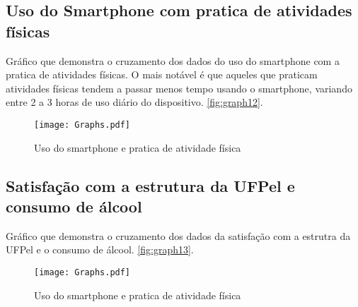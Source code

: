 \documentclass[11pt]{scrartcl} %
\begin{document}
\subsection{Uso do Smartphone com pratica de atividades físicas}

Gráfico que demonstra o cruzamento dos dados do uso do smartphone com a pratica de atividades físicas. O mais notável é que aqueles que praticam atividades físicas tendem a passar menos tempo usando o smartphone, variando entre 2 a 3 horas de uso diário do dispositivo. \ref{fig:graph12}.

\begin{figure}[h]
  \centering
  \texttt{[image: Graphs.pdf]}
  \label{fig:graph11}
  \caption{Uso do smartphone e pratica de atividade física}
\end{figure}

\subsection{Satisfação com a estrutura da UFPel e consumo de álcool}

Gráfico que demonstra o cruzamento dos dados da satisfação com a estrutra da UFPel e o consumo de álcool. \ref{fig:graph13}.

\begin{figure}[h]
  \centering
  \texttt{[image: Graphs.pdf]}
  \label{fig:graph11}
  \caption{Uso do smartphone e pratica de atividade física}
\end{figure}

\end{document}
